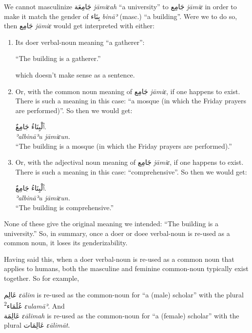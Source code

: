 \documentclass[
  10pt,
]{book}
\begin{document}
We cannot masculinize \foreignlanguage{arabic}{جَامِعَة} \emph{jāmiɛah} \enquote{a university} to \foreignlanguage{arabic}{جَامِع} \emph{jāmiɛ} in order to make it match the gender of \foreignlanguage{arabic}{بِنَاء} \emph{bināʾ} (masc.) \enquote{a building}. Were we to do so, then
\foreignlanguage{arabic}{جَامِع} \emph{jāmiɛ} would get interpreted with either:

\begin{enumerate}
\def\labelenumi{\arabic{enumi}.}
\item
  Its doer verbal-noun meaning \enquote{a gatherer}:

  \enquote{The building is a gatherer.}

  which doesn't make sense as a sentence.
\item
  Or, with the common noun meaning of \foreignlanguage{arabic}{جَامِع} \emph{jāmiɛ}, if one happens to exist. There is such a meaning in this case: \enquote{a mosque (in which the Friday prayers are performed)}. So then we would get:

  \foreignlanguage{arabic}{ٱَلْبِنَاءُ جَامِعٌ.}\\
  \emph{ʾalbināʾu jāmiɛun.}\\
  \enquote{The building is a mosque (in which the Friday prayers are performed).}
\item
  Or, with the adjectival noun meaning of \foreignlanguage{arabic}{جَامِع} \emph{jāmiɛ}, if one happens to exist. There is such a meaning in this case: \enquote{comprehensive}. So then we would get:

  \foreignlanguage{arabic}{ٱَلْبِنَاءُ جَامِعٌ.}\\
  \emph{ʾalbināʾu jāmiɛun.}\\
  \enquote{The building is comprehensive.}
\end{enumerate}

None of these give the original meaning we intended: \enquote{The building is a university.} So, in summary,
once a doer or doee verbal-noun is re-used as a common noun, it loses its genderizability.

Having said this, when a doer verbal-noun is re-used as a common noun that applies to humans, both the masculine and feminine common-noun typically exist together. So for example,

\foreignlanguage{arabic}{عَالِم} \emph{ɛālim} is re-used as the common-noun for \enquote{a (male) scholar} with the plural \foreignlanguage{arabic}{عُلَمَاء\textsuperscript{2}} \emph{ɛulamāʾ}.
And\\
\foreignlanguage{arabic}{عَالِمَة} \emph{ɛālimah} is re-used as the common-noun for \enquote{a (female) scholar} with the plural \foreignlanguage{arabic}{عَالِمَات} \emph{ɛālimāt}.
\end{document}
